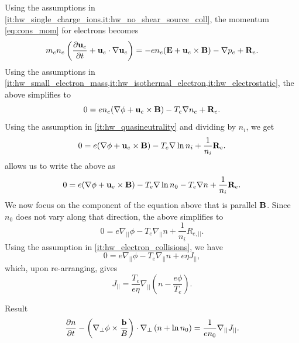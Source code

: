 \documentclass[oneside,a4paper,11pt]{report}
\begin{document}
Using the assumptions in \cref{it:hw_single_charge_ions,it:hw_no_shear_source_coll}, the momentum \cref{eq:cons_mom} for electrons becomes
\begin{equation}
    m_e n_e \left (\frac{\partial \mathbf{u}_e}{\partial t} + \mathbf{u}_e \cdot \nabla \mathbf{u}_e \right ) = -e n_e (\mathbf{E} + \mathbf{u}_e \times \mathbf{B}) - \nabla p_e + \mathbf{R}_e.
\end{equation}
Using the assumptions in \cref{it:hw_small_electron_mass,it:hw_isothermal_electron,it:hw_electrostatic}, the above simplifies to
\begin{equation}
    0 = e n_e (\nabla \phi + \mathbf{u}_e \times \mathbf{B}) - T_e \nabla n_e + \mathbf{R}_e.
\end{equation}
Using the assumption in \cref{it:hw_quasineutrality} and dividing by $n_i$, we get
\begin{equation}
    0 = e (\nabla \phi + \mathbf{u}_e \times \mathbf{B}) - T_e \nabla \ln n_i + \frac{1}{n_i}\mathbf{R}_e.
\end{equation}
 allows us to write the above as
\begin{equation}
    0 = e (\nabla \phi + \mathbf{u}_e \times \mathbf{B}) - T_e \nabla \ln n_0 - T_e \nabla n + \frac{1}{n_i}\mathbf{R}_e.
\end{equation}
We now focus on the component of the equation above that is parallel $\mathbf{B}$. Since $n_0$ does not vary along that direction, the above simplifies to
\begin{equation}
    0 = e \nabla_{||} \phi - T_e \nabla_{||} n + \frac{1}{n_i} R_{e,||}.
\end{equation}
Using the assumption in \cref{it:hw_electron_collisions}, we have
\begin{equation}
    0 = e \nabla_{||} \phi - T_e \nabla_{||} n + e \eta J_{||},
\end{equation}
which, upon re-arranging, gives
\begin{equation}
    \label{eq:hw_electron_momentum}
    J_{||} = \frac{T_e}{e \eta} \nabla_{||} \left ( n - \frac{e\phi}{T_e} \right ).
\end{equation}

Result
\begin{equation}
    \label{eq:hw_electron_continuity}
    \frac{\partial n}{\partial t} - \left ( \nabla_\perp \phi \times \frac{\mathbf{b}}{B} \right ) \cdot \nabla_\perp \left ( n + \ln n_0 \right ) = \frac{1}{en_0} \nabla_{||} J_{||}.
\end{equation}
\end{document}

